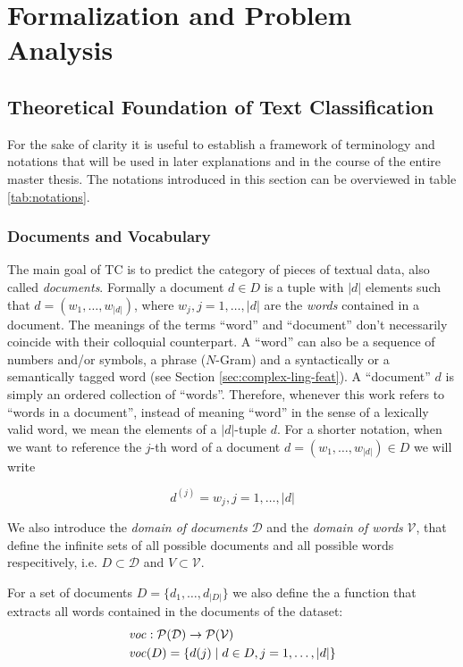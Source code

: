\chapter{Formalization and Problem Analysis}
\label{ch:problem-analysis}

\section{Theoretical Foundation of Text Classification}

\label{sec:formalization}
For the sake of clarity it is useful to establish a framework of terminology and
notations that will be used in later explanations and in the course of
the entire master thesis. The notations introduced in this section can be
overviewed in table \ref{tab:notations}.

\subsection{Documents and Vocabulary}
The main goal of TC is to predict the category of pieces of textual data, also
called \emph{documents}.
Formally a document $d \in D$ is a tuple with $|d|$ elements such that
$d = (w_1,\ldots,w_{|d|})$, where $w_j, j=1,\ldots,|d|$ are the \emph{words}
contained in a document.
The meanings of the terms ``word'' and ``document'' don't necessarily coincide
with their colloquial counterpart. A ``word'' can also be a sequence of numbers
and/or symbols, a phrase ($N$-Gram) and a syntactically or a semantically tagged
word (see Section \ref{sec:complex-ling-feat}). A ``document'' $d$ is simply an
ordered collection of ``words''. 
Therefore, whenever this work refers to ``words in a document'', instead of
meaning ``word'' in the sense of a lexically valid word, we mean the elements
of a $|d|$-tuple $d$. For a shorter notation, when we want to
reference the $j$-th word of a document $d=(w_1,\ldots,w_{|d|}) \in D$ we will
write

\begin{equation*}
d^{(j)} = w_j, j=1,\ldots, |d|
\end{equation*}

We also introduce the \emph{domain of documents} $\mathcal{D}$ and the
\emph{domain of words} $\mathcal{V}$, that define the infinite sets of all possible
documents and all possible words respecitively, i.e. $D \subset \mathcal{D}$ and $V \subset
\mathcal{V}$.

For a set of documents $D=\{d_1,\ldots,d_{|D|}\}$ we also define the
a function that extracts all words contained in the documents of the dataset:
\begin{equation*}
\begin{split}
\mathit{voc}&: \mathcal{P}(\mathcal{D}) \to \mathcal{P}(\mathcal{V}) \\
\mathit{voc}&(D) = \left\{d(j) \mid d \in D, j =
1,\ldots,|d|\right\}
\end{split}
\end{equation*}

